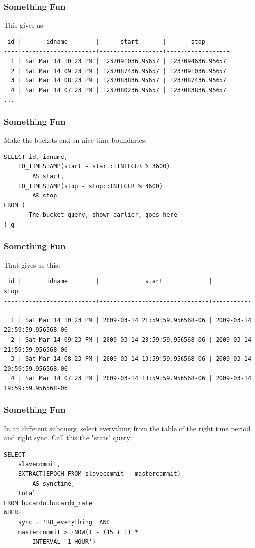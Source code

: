 \documentclass{beamer}
\begin{document}
\begin{frame}[fragile]
    \frametitle{Something Fun}
    This gives us:
    \scriptsize
    \begin{verbatim}
 id |       idname        |      start       |       stop
----+---------------------+------------------+------------------
  1 | Sat Mar 14 10:23 PM | 1237091036.95657 | 1237094636.95657
  2 | Sat Mar 14 09:23 PM | 1237087436.95657 | 1237091036.95657
  3 | Sat Mar 14 08:23 PM | 1237083836.95657 | 1237087436.95657
  4 | Sat Mar 14 07:23 PM | 1237080236.95657 | 1237083836.95657
...
    \end{verbatim}
    \normalsize
\end{frame}

\begin{frame}[fragile]
    \frametitle{Something Fun}
    Make the buckets end on nice time boundaries:
    \begin{verbatim}
SELECT id, idname,
    TO_TIMESTAMP(start - start::INTEGER % 3600)
        AS start,
    TO_TIMESTAMP(stop - stop::INTEGER % 3600)
        AS stop
FROM (
    -- The bucket query, shown earlier, goes here
) g
    \end{verbatim}
\end{frame}

\begin{frame}[fragile]
    \frametitle{Something Fun}
    That gives us this:
    \tiny
    \begin{verbatim}
 id |       idname        |             start             |             stop
----+---------------------+-------------------------------+-------------------------------
  1 | Sat Mar 14 10:23 PM | 2009-03-14 21:59:59.956568-06 | 2009-03-14 22:59:59.956568-06
  2 | Sat Mar 14 09:23 PM | 2009-03-14 20:59:59.956568-06 | 2009-03-14 21:59:59.956568-06
  3 | Sat Mar 14 08:23 PM | 2009-03-14 19:59:59.956568-06 | 2009-03-14 20:59:59.956568-06
  4 | Sat Mar 14 07:23 PM | 2009-03-14 18:59:59.956568-06 | 2009-03-14 19:59:59.956568-06
    \end{verbatim}
    \normalsize
\end{frame}

\begin{frame}[fragile]
    \frametitle{Something Fun}
    In an different subquery, select everything from the table of the right
    time period and right sync. Call this the "stats" query:
    \begin{verbatim}
SELECT
    slavecommit,
    EXTRACT(EPOCH FROM slavecommit - mastercommit)
        AS synctime,
    total
FROM bucardo.bucardo_rate
WHERE
    sync = 'RO_everything' AND
    mastercommit > (NOW() - (15 + 1) *
        INTERVAL '1 HOUR')
    \end{verbatim}
\end{frame}
\end{document}

